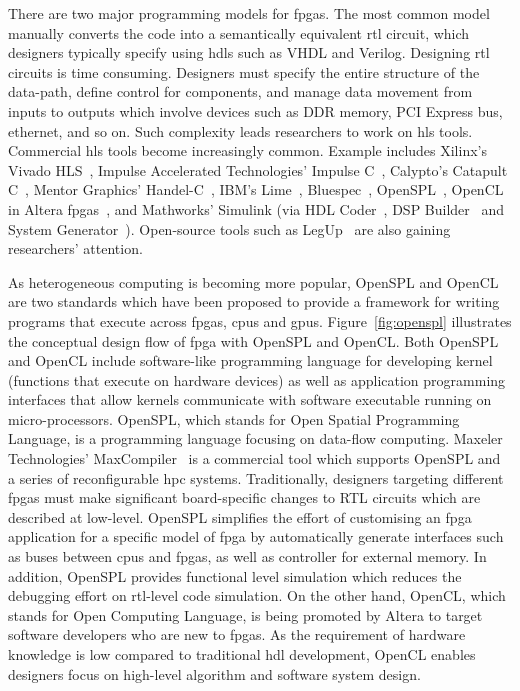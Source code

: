 There are two major programming models for \glspl{fpga}.
The most common model manually converts the code into a semantically equivalent \gls{rtl} circuit, which designers typically specify using \glspl{hdl} such as VHDL and Verilog.
Designing \gls{rtl} circuits is time consuming.
Designers must specify the entire structure of the data-path, define control for components, and manage data movement from inputs to outputs which involve devices such as DDR memory, PCI Express bus, ethernet, and so on.
Such complexity leads researchers to work on \gls{hls} tools.
Commercial \gls{hls} tools become increasingly common.
Example includes Xilinx's Vivado HLS~\cite{xilinxvivado}, Impulse Accelerated Technologies' Impulse C~\cite{impulsec}, Calypto's Catapult C~\cite{catapultc}, Mentor Graphics' Handel-C~\cite{handelc}, IBM's Lime~\cite{lime}, Bluespec~\cite{bluespec}, OpenSPL~\cite{openspl,maxcompiler}, OpenCL in Altera \glspl{fpga}~\cite{alteraopencl}, and Mathworks' Simulink (via HDL Coder~\cite{hdlcoder}, DSP Builder~\cite{alteradspbuilder} and System Generator~\cite{xilinxsysgen}).
Open-source tools such as LegUp~\cite{legup} are also gaining researchers' attention.

As heterogeneous computing is becoming more popular, OpenSPL and OpenCL are two standards which have been proposed to provide a framework for writing programs that execute across \glspl{fpga}, \glspl{cpu} and \glspl{gpu}.
Figure~\ref{fig:openspl} illustrates the conceptual design flow of \gls{fpga} with OpenSPL and OpenCL.
Both OpenSPL~\cite{openspl} and OpenCL include software-like programming language for developing kernel (functions that execute on hardware devices) as well as application programming interfaces that allow kernels communicate with software executable running on micro-processors.
OpenSPL, which stands for Open Spatial Programming Language, is a programming language focusing on data-flow computing.
Maxeler Technologies' MaxCompiler~\cite{maxcompiler} is a commercial tool which supports OpenSPL and a series of reconfigurable \gls{hpc} systems.
Traditionally, designers targeting different \glspl{fpga} must make significant board-specific changes to RTL circuits which are described at low-level.
OpenSPL simplifies the effort of customising an \gls{fpga} application for a specific model of \gls{fpga} by automatically generate interfaces such as buses between \glspl{cpu} and \glspl{fpga}, as well as controller for external memory.
In addition, OpenSPL provides functional level simulation which reduces the debugging effort on \gls{rtl}-level code simulation.
On the other hand, OpenCL, which stands for Open Computing Language, is being promoted by Altera to target software developers who are new to \glspl{fpga}.
As the requirement of hardware knowledge is low compared to traditional \gls{hdl} development, OpenCL enables designers focus on high-level algorithm and software system design.

